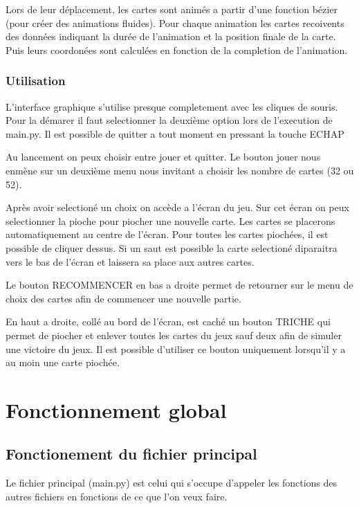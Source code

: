 \documentclass{scrartcl}
\newcommand{\ts}[1]{{\fontfamily{pcr}\selectfont #1}}
\begin{document}
Lors de leur déplacement, les cartes sont animés a partir d'une fonction bézier (pour créer des animations fluides).
Pour chaque animation les cartes recoivents des données indiquant la durée de l'animation et la position finale de la carte.
Puis leurs coordonées sont calculées en fonction de la completion de l'animation.

\subsubsection{Utilisation}
L'interface graphique s'utilise presque completement avec les cliques de souris.
Pour la démarer il faut selectionner la deuxième option lors de l'execution de \ts{main.py}.
Il est possible de quitter a tout moment en pressant la touche \ts{ECHAP}
 
Au lancement on peux choisir entre jouer et quitter. Le bouton jouer nous enmène sur un deuxième menu nous invitant a choisir les nombre de cartes (32 ou 52).
 
Après avoir selectioné un choix on accède a l'écran du jeu. 
Sur cet écran on peux selectionner la pioche pour piocher une nouvelle carte.
Les cartes se placerons automatiquement au centre de l'écran.  
Pour toutes les cartes piochées, il est possible de cliquer dessus. Si un saut est possible la carte selectioné diparaitra vers le bas de l'écran et laissera sa place aux autres cartes.
 
Le bouton \ts{RECOMMENCER} en bas a droite permet de retourner sur le menu de choix des cartes afin de commencer une nouvelle partie.  

En haut a droite, collé au bord de l'écran, est caché un bouton \ts{TRICHE} qui permet de piocher et enlever toutes les cartes du jeux sauf deux afin de simuler une victoire du jeux.
Il est possible d'utiliser ce bouton uniquement lorsqu'il y a au moin une carte piochée.


\section{Fonctionnement global}
\subsection{Fonctionement du fichier principal}
Le fichier principal (\ts{main.py}) est celui qui s'occupe d'appeler les fonctions des autres fichiers en fonctions de ce que l'on veux faire.
 
\end{document}
